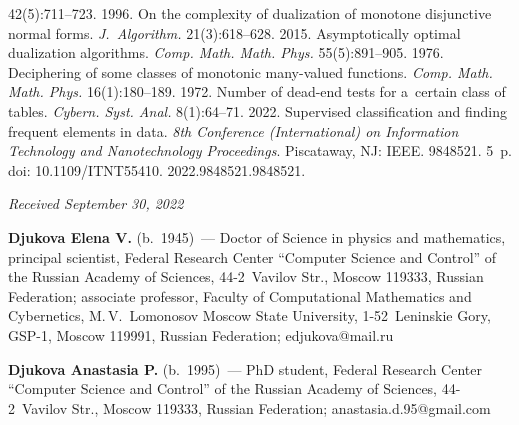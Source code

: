 \begin{multicols}{2}
{{\begin{thebibliography}{99}
42(5):711--723.
 1996. On the complexity of dualization of 
monotone disjunctive normal forms. \textit{J.~Algorithm.} 21(3):618--628.
 2015. Asymptotically optimal dualization 
algorithms. \textit{Comp. Math. Math. Phys.} 55(5):891--905. 
 1976. Deciphering of some classes of monotonic 
 many-valued functions. \textit{Comp. Math. Math. Phys.} 16(1):180--189.
 1972. Number of dead-end tests for a~certain class of tables. 
\textit{Cybern. Syst. Anal.} 8(1):64--71.
 2022. Supervised classification 
and finding frequent elements in data. \textit{8th Conference (International) on 
Information Technology and Nanotechnology Proceedings}. Piscataway, NJ: IEEE. 9848521. 5~p. doi: 10.1109/\mbox{ITNT55410}. 2022.9848521.9848521. 

\end{thebibliography}

 }
 }

\end{multicols}

\vspace*{-7pt}

\hfill{\small\textit{Received September 30, 2022}}

\vspace*{-16pt}

\Contr

\vspace*{-5pt}

\noindent
\textbf{Djukova Elena V.} (b.\ 1945)~--- Doctor of Science in physics and 
mathematics, principal scientist, Federal Research Center ``Computer Science and 
Control'' of the Russian Academy of Sciences, 44-2~Vavilov Str., Moscow 119333, 
Russian Federation; associate professor, Faculty of Computational Mathematics and 
Cybernetics, M.\,V.~Lomonosov Moscow State University, 1-52~Leninskie Gory, 
GSP-1, Moscow 119991, Russian Federation; \mbox{edjukova@mail.ru}

\vspace*{3pt}

\noindent
\textbf{Djukova Anastasia P.} (b.\ 1995)~--- PhD student, Federal Research Center 
``Computer Science and Control'' of the Russian Academy of Sciences, 44-2~Vavilov 
Str., Moscow 119333, Russian Federation; \mbox{anastasia.d.95@gmail.com}

\label{end\stat}

\renewcommand{\bibname}{\protect\rm Литература}    